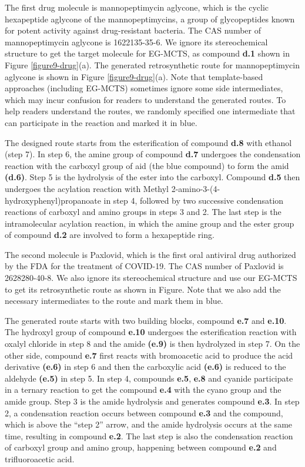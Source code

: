 \documentclass[sn-mathphys,Numbered]{sn-jnl}
\begin{document}
The first drug molecule is mannopeptimycin aglycone, which is the cyclic hexapeptide aglycone of the mannopeptimycins, a group of glycopeptides known for potent activity against drug-resistant bacteria.
The CAS number of mannopeptimycin aglycone is 1622135-35-6. We ignore its stereochemical structure to get the target molecule for EG-MCTS, as compound \textbf{d.1} shown in Figure \ref{figure9-drug}(a). The generated retrosynthetic route for mannopeptimycin aglycone is shown in Figure \ref{figure9-drug}(a). Note that template-based approaches (including EG-MCTS) sometimes ignore some side intermediates, which may incur confusion for readers to understand the generated routes. To help readers understand the routes, we randomly specified one intermediate that can participate in the reaction and marked it in blue.


The designed route starts from the esterification of compound \textbf{d.8} with ethanol (step 7).
In step 6, the amine group of compound \textbf{d.7} undergoes the condensation reaction with the carboxyl group of aid (the blue compound) to form the amid \textbf{(d.6)}. 
Step 5 is the hydrolysis of the ester into the carboxyl.
Compound \textbf{d.5} then undergoes the acylation reaction with Methyl 2-amino-3-(4-hydroxyphenyl)propanoate in step 4, followed by two successive condensation reactions of carboxyl and amino groups in steps 3 and 2. The last step is the intramolecular acylation reaction, in which the amine group and the ester group of compound \textbf{d.2} are involved to form a hexapeptide ring.

The second molecule is Paxlovid, which is the first oral antiviral drug authorized by the FDA for the treatment of COVID-19.
The CAS number of Paxlovid is 2628280-40-8. We also ignore its stereochemical structure and use our EG-MCTS to get its retrosynthetic route as shown in Figure. Note that we also add the necessary intermediates to the route and mark them in blue.

The generated route starts with two building blocks, compound \textbf{e.7} and \textbf{e.10}. The hydroxyl group of compound \textbf{e.10} undergoes the esterification reaction with oxalyl chloride in step 8 and the amide \textbf{(e.9)} is then hydrolyzed in step 7. On the other side, compound \textbf{e.7} first reacts with bromoacetic acid to produce the acid derivative \textbf{(e.6)} in step 6 and then the carboxylic acid \textbf{(e.6)} is reduced to the aldehyde \textbf{(e.5)} in step 5.
In step 4, compounds \textbf{e.5}, \textbf{e.8} and cyanide participate in a ternary reaction to get the compound \textbf{e.4} with the cyano group and the amide group. Step 3 is the amide hydrolysis and generates compound \textbf{e.3}. 
In step 2, a condensation reaction occurs between compound \textbf{e.3} and the compound, which is above the ``step 2'' arrow, and the amide hydrolysis occurs at the same time, resulting in compound \textbf{e.2}.
The last step is also the condensation reaction of carboxyl group and amino group, happening between compound \textbf{e.2} and trifluoroacetic acid.
\end{document}
